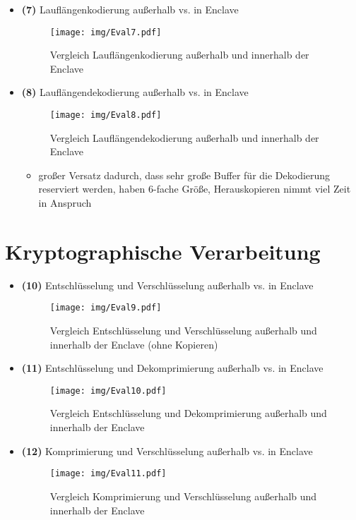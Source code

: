 \begin{itemize}
	
	\item \textbf{(7)} Lauflängenkodierung außerhalb vs. in Enclave
	\begin{figure}[h]
		\texttt{[image: img/Eval7.pdf]}
		\centering
		\caption{Vergleich Lauflängenkodierung außerhalb und innerhalb der Enclave}
		\label{fig:eval7}
	\end{figure}

	\item \textbf{(8)} Lauflängendekodierung außerhalb vs. in Enclave
	\begin{figure}[h]
		\texttt{[image: img/Eval8.pdf]}
		\centering
		\caption{Vergleich Lauflängendekodierung außerhalb und innerhalb der Enclave}
		\label{fig:eval8}
	\end{figure}

	\begin{itemize}
		\item großer Versatz dadurch, dass sehr große Buffer für die Dekodierung reserviert werden, haben 6-fache Größe, Herauskopieren nimmt viel Zeit in Anspruch
	\end{itemize}

\end{itemize}
\section{Kryptographische Verarbeitung}
\begin{itemize}	
	\item \textbf{(10)} Entschlüsselung und Verschlüsselung außerhalb vs. in Enclave
	\begin{figure}[h]
		\texttt{[image: img/Eval9.pdf]}
		\centering
		\caption{Vergleich Entschlüsselung und Verschlüsselung außerhalb und innerhalb der Enclave (ohne Kopieren)}
		\label{fig:eval9}
	\end{figure}
	
	\item \textbf{(11)} Entschlüsselung und Dekomprimierung außerhalb vs. in Enclave
	\begin{figure}[h]
		\texttt{[image: img/Eval10.pdf]}
		\centering
		\caption{Vergleich Entschlüsselung und Dekomprimierung außerhalb und innerhalb der Enclave}
		\label{fig:eval10}
	\end{figure}
	
	\item \textbf{(12)} Komprimierung und Verschlüsselung außerhalb vs. in Enclave
	\begin{figure}[h]
		\texttt{[image: img/Eval11.pdf]}
		\centering
		\caption{Vergleich Komprimierung und Verschlüsselung außerhalb und innerhalb der Enclave}
		\label{fig:eval11}
	\end{figure}
	
\end{itemize}

